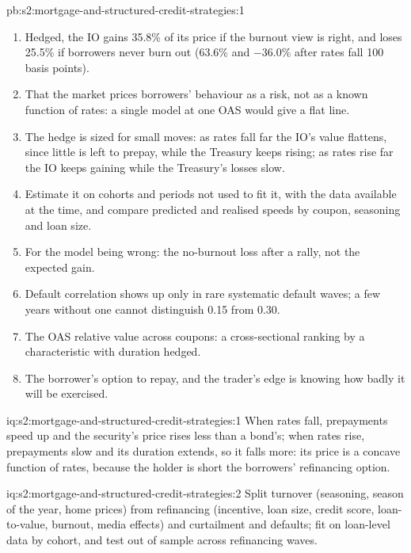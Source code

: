 \begin{solution}{pb:s2:mortgage-and-structured-credit-strategies:1}
\begin{enumerate}
9.4\%; at 0.45: $-1.4\%$, 15.0\%, 10.9\%.
\item Hedged, the IO gains 35.8\% of its price if the burnout view is right, and loses 25.5\% if borrowers never burn out (63.6\% and $-36.0\%$ after
rates fall 100 basis points).
\item That the market prices borrowers' behaviour as a risk, not as a known function of rates: a single model at one OAS would give a flat line.
\item The hedge is sized for small moves: as rates fall far the IO's value flattens, since little is left to prepay, while the Treasury keeps
rising; as rates rise far the IO keeps gaining while the Treasury's losses slow.
\item Estimate it on cohorts and periods not used to fit it, with the data available at the time, and compare predicted and realised speeds by
coupon, seasoning and loan size.
\item For the model being wrong: the no-burnout loss after a rally, not the expected gain.
\item Default correlation shows up only in rare systematic default waves; a few years without one cannot distinguish 0.15 from 0.30.
\item The OAS relative value across coupons: a cross-sectional ranking by a characteristic with duration hedged.
\item The borrower's option to repay, and the trader's edge is knowing how badly it will be exercised.
\end{enumerate}
\end{solution}

\begin{solution}{iq:s2:mortgage-and-structured-credit-strategies:1}
When rates fall, prepayments speed up and the security's price rises less than a bond's; when rates rise, prepayments slow and its duration extends,
so it falls more: its price is a concave function of rates, because the holder is short the borrowers' refinancing option.
\end{solution}

\begin{solution}{iq:s2:mortgage-and-structured-credit-strategies:2}
Split turnover (seasoning, season of the year, home prices) from refinancing (incentive, loan size, credit score, loan-to-value, burnout, media
effects) and curtailment and defaults; fit on loan-level data by cohort, and test out of sample across refinancing waves.
\end{solution}

